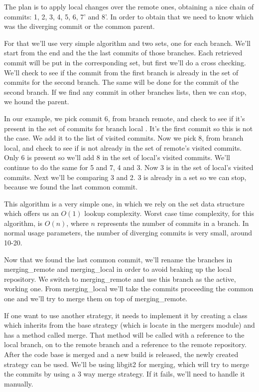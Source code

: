 The plan is to apply local changes over the remote ones, obtaining a nice chain of commits: 1, 2, 3, 4, 5, 6, 7' and 8'. In order to obtain that we need to know which was the diverging commit or the common parent. 

For that we'll use very simple algorithm and two sets, one for each branch. We'll start from the end and the the last commits of those branches. Each retrieved commit will be put in the corresponding set, but first we'll do a cross checking. We'll check to see if the commit from the first branch is already in the set of commits for the second branch. The same will be done for the commit of the second branch. If we find any commit in other branches lists, then we can stop, we hound the parent.

In our example, we pick commit 6, from branch remote, and check to see if it's present in the set of commits for branch local . It's the first commit so this is not the case. We add it to the list of visited commits. Now we pick 8, from branch local, and check to see if is not already in the set of remote's  visited commits.
Only 6 is present so we'll add 8 in the set of local's visited commits. We'll continue to do the same for 5 and 7, 4 and 3. Now 3 is in the set of local's visited commits. Next we'll be comparing 3 and 2. 3 is already in a set so we can stop, because we found the last common commit.

This algorithm is a very simple one, in which we rely on the set data structure which offers us an $O(1)$ lookup complexity. Worst case time complexity, for this algorithm, is $O(n)$, where $n$ represents the number of commits in a branch. In normal usage parameters, the number of diverging commits is very small, around 10-20.

Now that we found the last common commit, we'll rename the branches in merging\_remote and merging\_local in order to avoid braking up the local repository. We switch to merging\_remote and use this branch as the active, working one. From merging\_local we'll take the commits proceeding the common one and we'll try to merge them on top of merging\_remote. 

If one want to use another strategy, it needs to implement it by creating a class which inherits from the base strategy (which is locate in the mergers module) and has a method called merge. That method will be called with a reference to the local branch, on to the remote branch and a reference to the remote repository. After the code base is merged and a new build is released, the newly created strategy can be used. We'll be using libgit2 for merging, which will try to merge the commits by using a 3 way merge strategy. If it fails, we'll need to handle it manually.

